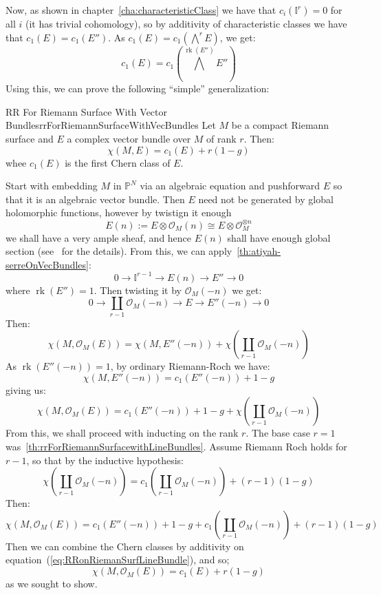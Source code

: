 \documentclass{book}
\newenvironment{Proof}[1][]
  {\begin{ProofTcb}[#1]}
  {\end{ProofTcb}}
\newcommand{\BI}{{\mathbb{I}}}
\renewcommand{\P}{{\mathbb{P}}}
\newcommand{\CO}{{\mathcal{O}}}
\newcommand{\rk}{{\operatorname{rk}}}
\newcommand{\Dcup}{\coprod}
\begin{document}
Now, as shown in chapter~\ref{cha:characteristicClass} we have that $c_i(\BI^r) = 0$ for all $i$ (it has
trivial cohomology), so by additivity of
characteristic classes we have that $c_1(E) = c_1(E'')$. As $c_1(E) = c_1 \left(\bigwedge^r E\right)$, we get:
\[
  c_1(E) = c_1 \left(\bigwedge^{\rk(E'')}E''\right)
\]
Using this, we can prove the following ``simple'' generalization:

\begin{thm}{RR For Riemann Surface With Vector Bundles}{rrForRiemannSurfaceWithVecBundles}
  Let $M$ be a compact Riemann surface and $E$ a complex vector bundle over $M$ of rank $r$. Then:
  \[
    \chi(M, E) = c_1(E) + r(1-g)
  \]
  whee $c_1(E)$ is the first Chern class of $E$.
\end{thm}

\begin{Proof}
  Start with embedding $M$ in $\P^N$ via an algebraic equation and pushforward $E$ so that it is an algebraic
  vector bundle. Then $E$ need not be generated by global holomorphic functions, however by twistign it enough
  \[
    E(n) := E\otimes \CO_M(n) \cong E\otimes \CO_M^{\otimes n}
  \]
  we shall have a very ample sheaf, and hence $E(n)$ shall have enough global section
  (see~\cite[section~4.4]{NateAlgGeo} for the details). From this, we can
  apply~\cref{th:atiyah-serreOnVecBundles}:
  \[
    0 \to \BI^{r-1} \to E(n) \to E'' \to 0
  \]
  where $\rk(E'') = 1$. Then twisting it by $\CO_M(-n)$ we get:
  \begin{equation}\label{eq:RRonRiemanSurfLineBundle}
    0 \to \Dcup_{r-1} \CO_M(-n) \to E \to E''(-n) \to 0
  \end{equation}
  Then:
  \[
    \chi(M, \CO_M(E)) = \chi(M, E''(-n)) + \chi \left( \Dcup_{r-1} \CO_M(-n)\right)
  \]
  As $\rk(E''(-n)) = 1$, by ordinary Riemann-Roch we have:
  \[
    \chi(M, E''(-n)) = c_1(E''(-n)) +1-g
  \]
  giving us:
  \[
    \chi(M, \CO_M(E)) = c_1(E''(-n)) +1-g  + \chi \left( \Dcup_{r-1} \CO_M(-n)\right)
  \]
  From this, we shall proceed with inducting on the rank $r$. The base case $r = 1$
  was~\cref{th:rrForRiemannSurfacewithLineBundles}. Assume Riemann Roch holds for $r-1$, so that by the
  inductive hypothesis:
  \[
    \chi \left( \Dcup_{r-1} \CO_M(-n)\right) = c_1 \left(\Dcup_{r-1} \CO_M(-n)\right) +(r-1)(1-g)
  \]
  Then:
  \[
    \chi(M, \CO_M(E)) = c_1(E''(-n)) +1-g  +c_1 \left(\Dcup_{r-1} \CO_M(-n)\right) +(r-1)(1-g)
  \]
  Then we can combine the Chern classes by additivity on equation~(\ref{eq:RRonRiemanSurfLineBundle}), and so;
  \[
    \chi(M, \CO_M(E)) = c_1(E) + r(1-g)
  \]
  as we sought to show.
\end{Proof}
\end{document}
